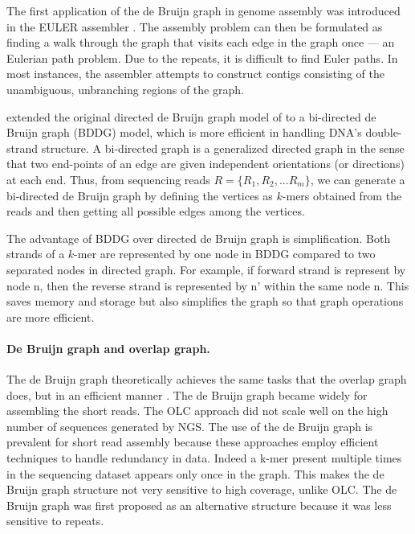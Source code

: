The first application of the de Bruijn graph in genome assembly was introduced in
the EULER assembler \citep{pevzner2001eulerian}. 
The assembly problem can then be formulated as finding a walk
through the graph that visits each edge in the graph once --- an Eulerian path problem.
Due to the repeats, it is difficult to find Euler paths. 
In most instances, the assembler attempts to construct
contigs consisting of the unambiguous, unbranching regions of the graph.

\cite{medvedev2007computability}
extended the original directed 
de  Bruijn  graph  model  of  \cite{pevzner2001eulerian}  to  a  bi-directed  
de  Bruijn  graph  (BDDG)  model,  which  is  more  efficient in 
handling DNA’s double-strand structure.  
A bi-directed graph is a generalized directed graph in the 
sense  that  two  end-points  of an  edge  are  given  independent  
orientations  (or  directions)  at   each  end. 
 Thus,  from  sequencing  reads $ R  =  \{R_1,  R_2,  ...  R_m\}$,  we  can  
generate a bi-directed de Bruijn graph by defining the 
vertices  as  $k$-mers  obtained  
from  the  reads  and  then  getting  
all possible edges among the vertices. 


The  advantage  of  BDDG  over  directed  de Bruijn  graph  is  simplification.  Both  strands  of  a  $k$-mer  are  
represented   by   one   node   in   BDDG   compared   to   two   
separated  nodes  in  directed  graph.  For example, if forward strand is represent by node n, then the reverse strand is represented by n' within the same node n.
This saves memory and storage but also simplifies the graph so that graph operations are more efficient.

\paragraph{De Bruijn graph and overlap graph.}
The de Bruijn graph theoretically achieves
the same tasks that the overlap graph does, but in an efficient manner \citep{li2012comparison}.
The de Bruijn graph became widely for assembling the short reads. The OLC
approach did not scale well on the high number of sequences generated by NGS. The
use of the de Bruijn graph is prevalent for short read assembly because these approaches employ efficient techniques to handle redundancy in data. Indeed a k-mer
present multiple times in the sequencing dataset appears only once in the graph. This
makes the de Bruijn graph structure not very sensitive to high coverage, unlike
OLC. The de Bruijn graph was first proposed as an alternative structure \citep{pevzner2001eulerian} because it
was less sensitive to repeats. 

